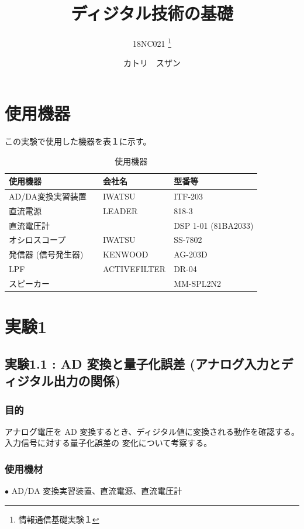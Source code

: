 \documentclass[10pt]{article}
\title{ディジタル技術の基礎}
\author{18NC021 \thanks{情報通信基礎実験１}}
\date{カトリ　スザン}
\begin{document}
\begin{titlepage}
	\maketitle
\end{titlepage}
 
\tableofcontents
\pagebreak

 

\section{使用機器}
この実験で使用した機器を表１に示す。
\begingroup
\setlength{\tabcolsep}{5pt} %
\renewcommand{\arraystretch}{1.5} %
\begin{table}[H]
    \centering
	\caption{使用機器}
	\begin{tabular}{|l|l|l|}
	    \hline
	    使用機器 & 会社名 & 型番等\\[0.5ex]
		\hline\hline
		AD/DA変換実習装置　& IWATSU &ITF-203	 \\ \hline
		直流電源	& LEADER & 818-3\\ \hline
		直流電圧計　　&	 & DSP 1-01 (81BA2033)\\ \hline
        オシロスコープ　& IWATSU &	SS-7802 \\ \hline
        発信器 (信号発生器)　& KENWOOD &	AG-203D \\ \hline
        LPF　& ACTIVEFILTER &	DR-04 \\ \hline
        スピーカー　&  &	MM-SPL2N2 \\ \hline
	\end{tabular}
\end{table} 
\endgroup

\section{実験1}
\subsection{実験1.1 : AD 変換と量子化誤差 (アナログ入力とディジタル出力の関係)}

\subsubsection{目的}
アナログ電圧を AD 変換するとき、ディジタル値に変換される動作を確認する。入力信号に対する量子化誤差の 変化について考察する。
\subsubsection{使用機材}
$\bullet$ AD/DA 変換実習装置、直流電源、直流電圧計
\end{document}
